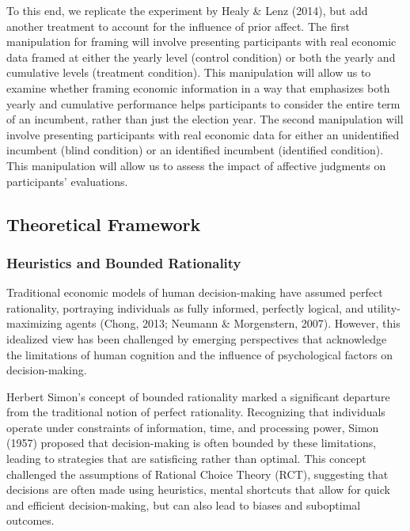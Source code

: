 \documentclass[
]{article}
\begin{document}
To this end, we replicate the experiment by Healy \& Lenz (2014), but
add another treatment to account for the influence of prior affect. The
first manipulation for framing will involve presenting participants with
real economic data framed at either the yearly level (control condition)
or both the yearly and cumulative levels (treatment condition). This
manipulation will allow us to examine whether framing economic
information in a way that emphasizes both yearly and cumulative
performance helps participants to consider the entire term of an
incumbent, rather than just the election year. The second manipulation
will involve presenting participants with real economic data for either
an unidentified incumbent (blind condition) or an identified incumbent
(identified condition). This manipulation will allow us to assess the
impact of affective judgments on participants' evaluations.

\hypertarget{theoretical-framework}{%
\subsection{Theoretical Framework}\label{theoretical-framework}}

\hypertarget{heuristics-and-bounded-rationality}{%
\subsubsection{Heuristics and Bounded
Rationality}\label{heuristics-and-bounded-rationality}}

Traditional economic models of human decision-making have assumed
perfect rationality, portraying individuals as fully informed, perfectly
logical, and utility-maximizing agents (Chong, 2013; Neumann \&
Morgenstern, 2007). However, this idealized view has been challenged by
emerging perspectives that acknowledge the limitations of human
cognition and the influence of psychological factors on decision-making.

Herbert Simon's concept of bounded rationality marked a significant
departure from the traditional notion of perfect rationality.
Recognizing that individuals operate under constraints of information,
time, and processing power, Simon (1957) proposed that decision-making
is often bounded by these limitations, leading to strategies that are
satisficing rather than optimal. This concept challenged the assumptions
of Rational Choice Theory (RCT), suggesting that decisions are often
made using heuristics, mental shortcuts that allow for quick and
efficient decision-making, but can also lead to biases and suboptimal
outcomes.
\end{document}
